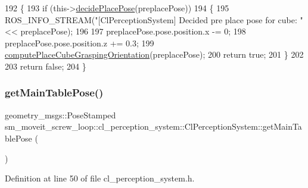 \begin{DoxyCode}
192             \{
193                 \textcolor{keywordflow}{if} (this->\hyperlink{classsm__moveit__screw__loop_1_1cl__perception__system_1_1ClPerceptionSystem_a9157b898cd0b4004cf3d9144f7c1d163}{decidePlacePose}(preplacePose))
194                 \{
195                     ROS\_INFO\_STREAM(\textcolor{stringliteral}{"[ClPerceptionSystem] Decided pre place pose for cube: "} << 
      preplacePose);
196 
197                     preplacePose.pose.position.x -= 0;
198                     preplacePose.pose.position.z += 0.3;
199                     \hyperlink{classsm__moveit__screw__loop_1_1cl__perception__system_1_1ClPerceptionSystem_a8e5d2e5a7f3ba117c67534750237cada}{computePlaceCubeGraspingOrientation}(preplacePose);
200                     \textcolor{keywordflow}{return} \textcolor{keyword}{true};
201                 \}
202 
203                 \textcolor{keywordflow}{return} \textcolor{keyword}{false};
204             \}
\end{DoxyCode}
\mbox{\label{classsm__moveit__screw__loop_1_1cl__perception__system_1_1ClPerceptionSystem_a134e71d552de7d2a601927cdb2903d2b}} 
\subsubsection{\texorpdfstring{get\+Main\+Table\+Pose()}{getMainTablePose()}}
{\footnotesize\ttfamily geometry\+\_\+msgs\+::\+Pose\+Stamped sm\+\_\+moveit\+\_\+screw\+\_\+loop\+::cl\+\_\+perception\+\_\+system\+::\+Cl\+Perception\+System\+::get\+Main\+Table\+Pose (\begin{DoxyParamCaption}{ }\end{DoxyParamCaption})\hspace{0.3cm}{\ttfamily [inline]}}



Definition at line 50 of file cl\+\_\+perception\+\_\+system.\+h.



